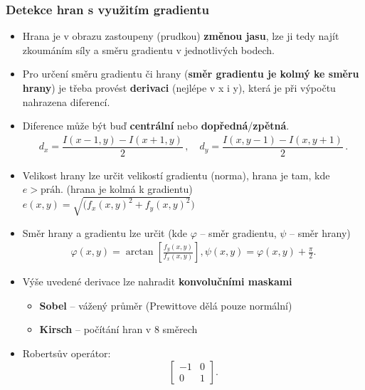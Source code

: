 \subsubsection{Detekce hran s využitím gradientu}
\begin{itemize}
 	\item Hrana je v obrazu zastoupeny (prudkou) \textbf{změnou jasu}, lze ji tedy najít zkoumáním síly a směru gradientu v jednotlivých bodech.
 	\item Pro určení směru gradientu či hrany (​\textbf{směr gradientu je kolmý ke směru hrany​}) je třeba provést ​ \textbf{derivaci​} (nejlépe v x i y), která je při výpočtu nahrazena diferencí.
 	\item Diference může být buď \textbf{centrální} nebo \textbf{dopředná}/\textbf{zpětná}.
 	\begin{equation*}
 		\begin{split}
 		d_x = \dfrac{I(x - 1, y) - I(x + 1, y)}{2} \, , \quad 		d_y= \dfrac{I(x, y - 1) - I(x, y + 1)}{2} \, .
 		\end{split}
 	\end{equation*}
 	 \item Velikost hrany lze určit velikostí gradientu (norma), hrana je tam, kde $e > \textrm{práh}$. (hrana je kolmá k gradientu) \\
 	 $ e(x, y) = \sqrt{(f_x(x,y)^2+ f_y(x,y)^2})$
 	 \item Směr hrany a gradientu lze určit (kde $\varphi$ -- směr gradientu, $\psi$ -- směr hrany) 
 	  	\begin{equation*}
 		\begin{array}{c}
 		\varphi(x, y) = \arctan{[\frac{f_y(x,y)}{f_x(x,y)}]}, \psi(x,y) = \varphi(x,y) + \frac{\pi}{2}.
 		\end{array}
 	\end{equation*}
 	\item Výše uvedené derivace lze nahradit \textbf{konvolučními maskami}
 	\begin{itemize}
 		\item \textbf{Sobel} -- vážený průměr (Prewittove dělá pouze normální)
 		\item \textbf{Kirsch} -- počítání hran v 8 směrech
 	\end{itemize}
	\item Robertsův operátor:
	\begin{equation*}
 		\begin{bmatrix}
     -1 & 0      \\[0.3em]
     0 & 1  
          \end{bmatrix}.

\end{equation*}
\end{itemize}
